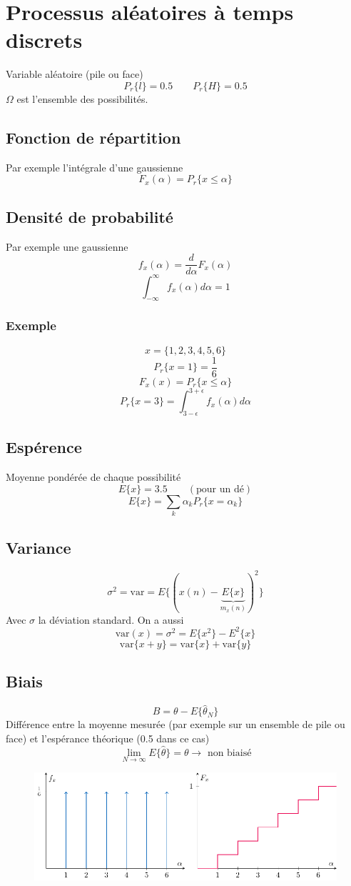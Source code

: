 \documentclass[resume]{subfiles}
\begin{document}
\section{Processus aléatoires à temps discrets}
Variable aléatoire (pile ou face)
$$P_r\lbrace l\rbrace = 0.5\qquad P_r\lbrace H\rbrace=0.5$$
$\Omega$ est l'ensemble des possibilités.\\
\subsection{Fonction de répartition}
Par exemple l'intégrale d'une gaussienne
$$F_x(\alpha)=P_r\lbrace x\leq \alpha\rbrace$$
\subsection{Densité de probabilité}
Par exemple une gaussienne
$$f_x(\alpha)=\frac{d}{d\alpha}F_x(\alpha)$$
$$\int_{-\infty}^{\infty}f_x(\alpha)d\alpha=1$$
\subsubsection{Exemple}
$$x=\lbrace 1,2,3,4,5,6\rbrace$$
$$P_r\lbrace x=1\rbrace=\frac{1}{6}$$
$$F_x(x)=P_r\lbrace x\leq \alpha\rbrace$$
$$P_r\lbrace x=3\rbrace =\int_{3-\epsilon}^{3+\epsilon}f_x(\alpha)d\alpha$$

\subsection{Espérence}
Moyenne pondérée de chaque possibilité
$$E\lbrace x\rbrace=3.5\qquad (\text{pour un dé})$$
$$E\lbrace x\rbrace=\sum_{k}\alpha_kP_r\lbrace x=\alpha_k\rbrace$$
\subsection{Variance}
$$\sigma^2=\text{var}=E\lbrace (x(n)-\underbrace{E\lbrace x\rbrace}_{m_x(n)})^2\rbrace$$
Avec $\sigma$ la déviation standard. On a aussi
$$\text{var}(x)=\sigma^2=E\lbrace x^2\rbrace-E^2\lbrace x\rbrace$$
$$\text{var}\lbrace x+y\rbrace=\text{var}\lbrace x\rbrace+\text{var}\lbrace y\rbrace$$
\subsection{Biais}
$$B=\theta-E\lbrace \hat{\theta}_N\rbrace$$
Différence entre la moyenne mesurée (par exemple sur un ensemble de pile ou face) et l'espérance théorique (0.5 dans ce cas)
$$\lim_{N\to\infty}E\lbrace \hat{\theta}\rbrace=\theta\longrightarrow \text{ non biaisé}$$
\begin{figure}[H]
\centering
\includegraphics[width=0.9\columnwidth, page=1]{drwg_3.pdf}
\end{figure}
\end{document}
